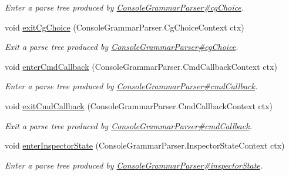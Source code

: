 \begin{DoxyCompactItemize}
\begin{DoxyCompactList}\small\item\em Enter a parse tree produced by \hyperlink{classgov_1_1nasa_1_1jpf_1_1inspector_1_1client_1_1parser_1_1_console_grammar_parser_ae9e68f2464be6f44c270bac7de701f69}{Console\+Grammar\+Parser\#cg\+Choice}. \end{DoxyCompactList}\item 
void \hyperlink{interfacegov_1_1nasa_1_1jpf_1_1inspector_1_1client_1_1parser_1_1_console_grammar_listener_a267a28631a31451c4ce39da86cb015cb}{exit\+Cg\+Choice} (Console\+Grammar\+Parser.\+Cg\+Choice\+Context ctx)
\begin{DoxyCompactList}\small\item\em Exit a parse tree produced by \hyperlink{classgov_1_1nasa_1_1jpf_1_1inspector_1_1client_1_1parser_1_1_console_grammar_parser_ae9e68f2464be6f44c270bac7de701f69}{Console\+Grammar\+Parser\#cg\+Choice}. \end{DoxyCompactList}\item 
void \hyperlink{interfacegov_1_1nasa_1_1jpf_1_1inspector_1_1client_1_1parser_1_1_console_grammar_listener_a421da54e894434a060b4f263911c0b18}{enter\+Cmd\+Callback} (Console\+Grammar\+Parser.\+Cmd\+Callback\+Context ctx)
\begin{DoxyCompactList}\small\item\em Enter a parse tree produced by \hyperlink{classgov_1_1nasa_1_1jpf_1_1inspector_1_1client_1_1parser_1_1_console_grammar_parser_af893e7316098e4d23ed6419676687461}{Console\+Grammar\+Parser\#cmd\+Callback}. \end{DoxyCompactList}\item 
void \hyperlink{interfacegov_1_1nasa_1_1jpf_1_1inspector_1_1client_1_1parser_1_1_console_grammar_listener_a56656b35307cb0f9fb571664635dbead}{exit\+Cmd\+Callback} (Console\+Grammar\+Parser.\+Cmd\+Callback\+Context ctx)
\begin{DoxyCompactList}\small\item\em Exit a parse tree produced by \hyperlink{classgov_1_1nasa_1_1jpf_1_1inspector_1_1client_1_1parser_1_1_console_grammar_parser_af893e7316098e4d23ed6419676687461}{Console\+Grammar\+Parser\#cmd\+Callback}. \end{DoxyCompactList}\item 
void \hyperlink{interfacegov_1_1nasa_1_1jpf_1_1inspector_1_1client_1_1parser_1_1_console_grammar_listener_ae0d1d6958cc56b07c3d25b6c08e96c0a}{enter\+Inspector\+State} (Console\+Grammar\+Parser.\+Inspector\+State\+Context ctx)
\begin{DoxyCompactList}\small\item\em Enter a parse tree produced by \hyperlink{classgov_1_1nasa_1_1jpf_1_1inspector_1_1client_1_1parser_1_1_console_grammar_parser_ab57ca165e59675ed40c9b04da3c7d569}{Console\+Grammar\+Parser\#inspector\+State}. \end{DoxyCompactList}\item 

\end{DoxyCompactItemize}
